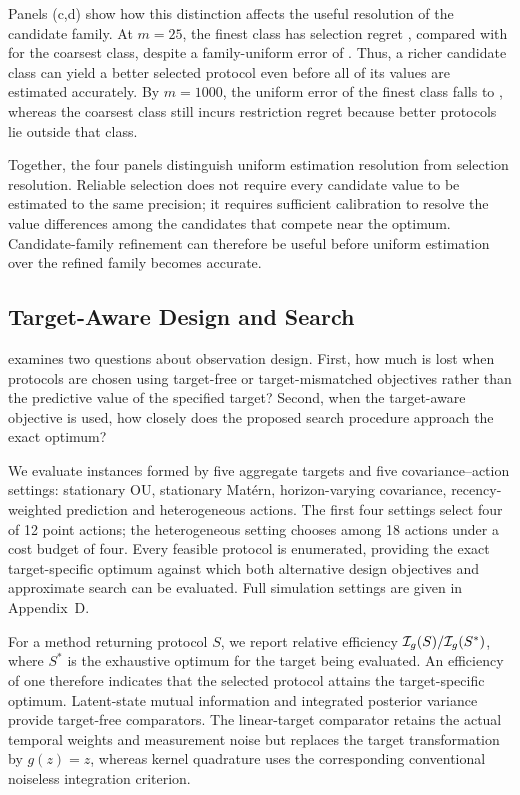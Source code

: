 Panels (c,d) show how this distinction affects the useful resolution of the
candidate family. At $m=25$, the finest class has selection regret
\numResRegretFineSmall, compared with \numResRegretCoarseSmall{} for the
coarsest class, despite a family-uniform error of \numResEpsFourSmall.
Thus, a richer candidate class can yield a better selected protocol even
before all of its values are estimated accurately. By $m=1000$, the uniform
error of the finest class falls to \numResEpsFourLarge, whereas the coarsest
class still incurs restriction regret \numResRegretCoarseLarge{} because
better protocols lie outside that class.

Together, the four panels distinguish uniform estimation resolution from
selection resolution. Reliable selection does not require every candidate
value to be estimated to the same precision; it requires sufficient
calibration to resolve the value differences among the candidates that compete
near the optimum. Candidate-family refinement can therefore be useful before
uniform estimation over the refined family becomes accurate.



\subsection{Target-Aware Design and Search}
\label{sec:target-design-experiment}

 examines two questions about observation design. First, how much
is lost when protocols are chosen using target-free or target-mismatched
objectives rather than the predictive value of the specified target? Second,
when the target-aware objective is used, how closely does the proposed search
procedure approach the exact optimum?

We evaluate \numDesignComparableInstances{} instances formed by five aggregate
targets and five covariance--action settings: stationary OU, stationary
Mat\'ern, horizon-varying covariance, recency-weighted prediction and
heterogeneous actions. The first four settings select four of 12 point actions;
the heterogeneous setting chooses among 18 actions under a cost budget of four.
Every feasible protocol is enumerated, providing the exact target-specific
optimum against which both alternative design objectives and approximate search
can be evaluated. Full simulation settings are given in Appendix~D.

For a method returning protocol $S$, we report relative efficiency
$\mathcal{I}_g(S)/\mathcal{I}_g(S^*)$, where $S^*$ is the exhaustive optimum for the target
being evaluated. An efficiency of one therefore indicates that the selected
protocol attains the target-specific optimum. Latent-state mutual information
and integrated posterior variance provide target-free comparators. The
linear-target comparator retains the actual temporal weights and measurement
noise but replaces the target transformation by $g(z)=z$, whereas kernel
quadrature uses the corresponding conventional noiseless integration
criterion.

